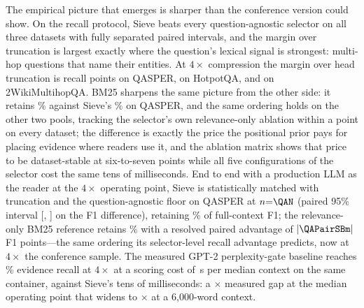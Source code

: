\documentclass[pdflatex,sn-basic]{sn-jnl}
\DeclarePairedDelimiter\abs{\lvert}{\rvert}
\theoremstyle{remark}
\newcommand{\method}{Sieve}
\begin{document}
The empirical picture that emerges is sharper than the conference
version could show. On the recall protocol, \method{} beats every
question-agnostic selector on all three datasets with fully separated
paired intervals, and the margin over truncation is largest exactly
where the question's lexical signal is strongest: multi-hop questions
that name their entities. At $4\times$ compression the margin over
head truncation is \PairQSH{} recall points on QASPER, \PairHSH{} on
HotpotQA, and \PairWSH{} on 2WikiMultihopQA. BM25 sharpens the same
picture from the other side: it retains \RecQBm\% against
\method{}'s \RecQSie\% on QASPER, and the same ordering holds on the
other two pools, tracking the selector's own relevance-only ablation
within a point on every dataset; the difference is exactly the price
the positional prior pays for placing evidence where readers use it,
and the ablation matrix shows that price to be dataset-stable at
six-to-seven points while all five configurations of the selector
cost the same tens of milliseconds.
End to end with a production LLM as the reader at the $4\times$
operating point, \method{} is statistically matched with truncation
and the question-agnostic floor on QASPER at $n{=}\QAN$ (paired 95\%
interval [\QAPairSHLo, \QAPairSHHi] on the F1 difference), retaining
\QASieRetain\% of full-context F1; the relevance-only BM25 reference
retains \QABmRetain\% with a resolved paired advantage of
$\abs{\QAPairSBm}$ F1 points---the same ordering its selector-level
recall advantage predicts, now at $4\times$ the conference sample. The
measured GPT-2
perplexity-gate baseline reaches \GateRecall\% evidence recall at
$4\times$ at a scoring cost of \GateLatMedCtxS\,s per median context
on the same container, against \method{}'s tens of milliseconds: a
\GateSieRatioMed$\times$ measured gap at the median operating point
that widens to \GateSieRatioSixk$\times$ at a 6{,}000-word context.
\end{document}
